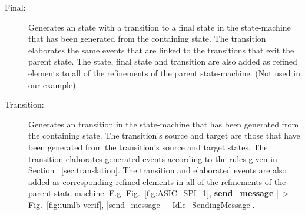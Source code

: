 \begin{description}
\item[Final:] Generates an \iUMLB state with a transition to a final state in the state-machine that has been generated from the containing \SCXML state. 
The transition elaborates the same events that are linked to the transitions that exit the parent \iUMLB state. 
The \iUMLB state, final state and transition are also added as refined elements to all of the refinements of the parent \iUMLB state-machine.
(Not used in our example).

\item[Transition:] Generates an \iUMLB transition in the state-machine that has been generated from the containing \SCXML state. 
The \iUMLB transition’s source and target are those that have been generated from the \SCXML transition’s source and target states. 
The transition elaborates generated \EventB events according to the rules given in Section ~\ref{sec:translation}. 
The \iUMLB transition and elaborated \EventB events are also added as corresponding refined elements in all of the refinements of the parent \iUMLB state-machine.
E.g. Fig.~\ref{fig:ASIC_SPI_1}, \textbf{send\_message} |-->| Fig.~\ref{fig:iumlb-verif}, |send_message__Idle_SendingMessage|.


\end{description}



